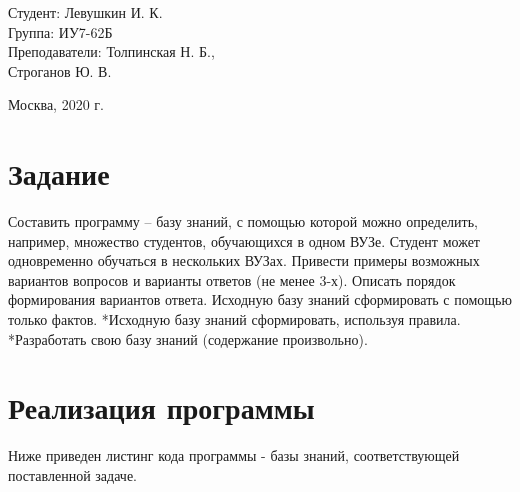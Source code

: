 \documentclass[a4paper,12pt]{article}
\begin{document}
	\vspace*{15mm} 	
	
	\large
	\begin{flushright}
		Студент: Левушкин И. К. \\
		Группа: ИУ7-62Б \\
		Преподаватели: Толпинская Н. Б., \\ Строганов Ю. В. \\
	\end{flushright}
	
	\vspace*{30mm}
	\begin{center}
		Москва, 2020 г.  
	\end{center}
	\thispagestyle{empty}
	
	
	\newpage
	
	\section{Задание}
	
	Составить программу – базу знаний, с помощью которой можно определить, например, множество студентов, обучающихся в одном ВУЗе. Студент может одновременно обучаться в нескольких ВУЗах. Привести примеры возможных вариантов вопросов и варианты ответов (не менее 3-х). Описать порядок формирования вариантов ответа.
	Исходную базу знаний сформировать с помощью только фактов. 
	*Исходную базу знаний сформировать, используя правила.
	*Разработать свою базу знаний (содержание произвольно).
	
	\section{Реализация программы}
	
	Ниже приведен листинг кода программы - базы знаний, соответствующей поставленной задаче.
	
\end{document}
